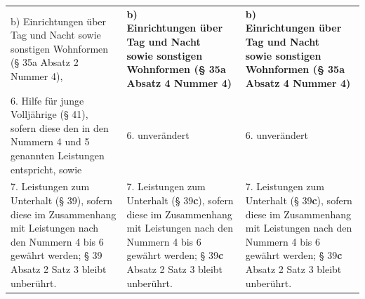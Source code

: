 \documentclass[10pt,a4paper,landscape]{article}
\begin{document}
\begin{longtable}{|L{8.2cm}|L{8.2cm}|L{8.2cm}|}
\hhline{|---|}
b)  \newline Einrichtungen über Tag und Nacht sowie  \newline sonstigen Wohnformen (\S{} 35a Absatz \textcolor{diffred}{2}  \newline Nummer \textcolor{diffred}{4),} & \textbf{b)   \newline Einrichtungen über Tag und Nacht  \newline sowie sonstigen Wohnformen (\S{} 35a  \newline Absatz 4 Nummer 4) } & \textbf{b)   \newline Einrichtungen über Tag und Nacht  \newline sowie sonstigen Wohnformen (\S{} 35a  \newline Absatz 4 Nummer 4) } \\
\hhline{|---|}
6.  \newline Hilfe für junge Volljährige (\S{} 41), sofern  \newline diese den in den Nummern 4 und 5  \newline genannten Leistungen entspricht, sowie & 6. unverändert & 6. unverändert \\
\hhline{|---|}
7.  \newline Leistungen zum Unterhalt (\S{} \textcolor{diffred}{39),} sofern  \newline diese im Zusammenhang mit Leistungen  \newline nach den Nummern 4 bis 6 gewährt  \newline werden; \S{} \textcolor{diffred}{39} Absatz 2 Satz 3 bleibt  \newline unberührt. & 7.   \newline Leistungen zum Unterhalt (\S{} 39\textbf{c}), sofern  \newline diese im Zusammenhang mit Leistungen  \newline nach den Nummern 4 bis 6 gewährt  \newline werden; \S{} 39\textbf{c} Absatz 2 Satz 3 bleibt  \newline unberührt. & 7.   \newline Leistungen zum Unterhalt (\S{} 39\textbf{c}), sofern  \newline diese im Zusammenhang mit Leistungen  \newline nach den Nummern 4 bis 6 gewährt  \newline werden; \S{} 39\textbf{c} Absatz 2 Satz 3 bleibt  \newline unberührt. \\

\end{longtable}
\end{document}
